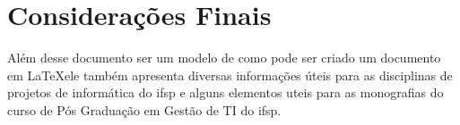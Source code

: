 \chapter*{Considerações Finais}

Além desse documento ser um modelo de como pode ser criado um documento em \LaTeX \space ele também apresenta diversas informações úteis para as disciplinas de projetos de informática do \ac{ifsp} e alguns elementos uteis para as monografias do curso de Pós Graduação em Gestão de TI do \ac{ifsp}.
